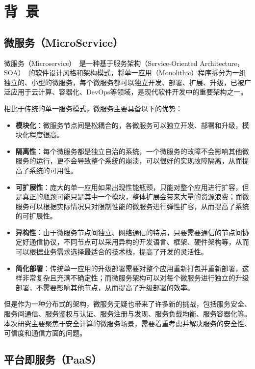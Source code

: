 \section{背\ 景}\label{sec:background}

\subsection{微服务（MicroService）}
微服务（Microservice）~\cite{lewis2014microservices}是一种基于服务架构（Service-Oriented Architecture，SOA）~\cite{papazoglou2007service}的软件设计风格和架构模式，将单一应用（Monolithic）程序拆分为一组独立的、小型的微服务，每个微服务都可以独立开发、部署、扩展、升级，已被广泛应用于云计算、容器化、DevOps等领域，是现代软件开发中的重要架构之一。

相比于传统的单一服务模式，微服务主要具备以下的优势：

\begin{itemize}
    \item \textbf{模块化}：微服务节点间是松耦合的，各微服务可以独立开发、部署和升级，模块化程度很高。
    \item \textbf{隔离性}：每个微服务都是独立自治的系统，一个微服务的故障不会影响其他微服务的运行，更不会导致整个系统的崩溃，可以很好的实现故障隔离，从而提高了系统的可用性。
    \item \textbf{可扩展性}：庞大的单一应用如果出现性能瓶颈，只能对整个应用进行扩容，但是真正的瓶颈可能只是其中一个模块，整体扩展会带来大量的资源浪费；而微服务可以根据实际情况只对限制性能的微服务进行弹性扩容，从而提高了系统的可扩展性。
    \item \textbf{异构性}：由于微服务节点间独立、网络通信的特点，只要需要通信的节点间协定好通信协议，不同节点可以采用异构的开发语言、框架、硬件架构等，从而可以根据业务需求选择最适合的技术栈，提高了开发的灵活性。
    \item \textbf{简化部署}：传统单一应用的升级部署需要对整个应用重新打包并重新部署，这样非常复杂且充满不确定性；而微服务架构可以对每个微服务进行独立的升级部署，不需要影响其他节点，从而提高了升级部署的效率。
\end{itemize}

但是作为一种分布式的架构，微服务无疑也带来了许多新的挑战，包括服务安全、服务间通信、服务鉴权与认证、服务注册与发现、服务负载均衡、服务容器化等。本次研究主要聚焦于安全计算的微服务场景，需要着重考虑并解决服务的安全性、可信度和通信方面的问题。

\subsection{平台即服务（PaaS）}

